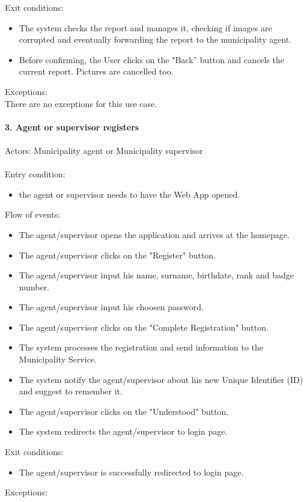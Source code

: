 \documentclass[a4paper]{report}
\begin{document}
Exit conditions:
\begin{itemize}
\item The system checks the report and manages it, checking if images are corrupted and eventually forwarding the report to the municipality agent.
\item	Before confirming, the User clicks on the "Back” button and cancels the current report. Pictures are cancelled too. 
\end{itemize}
Exceptions: \\
There are no exceptions for this use case. 
\\
\\
\textbf{3. Agent or supervisor registers}\label{uc:3}
\\
\\
Actors: Municipality agent or Municipality supervisor \\ \\
Entry condition:
\begin{itemize}
\item the agent or supervisor needs to have the Web App opened.
\end{itemize}
Flow of events:
\begin{itemize}
\item The agent/supervisor opens the application and arrives at the homepage.
\item The agent/supervisor clicks on the "Register" button.
\item The agent/supervisor input his name, surname, birthdate, rank and badge number.
\item The agent/supervisor input his choosen password.
\item The agent/supervisor clicks on the "Complete Registration" button.
\item The system processes the registration and send information to the Municipality Service.
\item The system notify the agent/supervisor about his new Unique Identifier (ID) and suggest to remember it. 
\item The agent/supervisor clicks on the "Understood" button.
\item The system redirects the agent/supervisor to login page.
\end{itemize}
Exit conditions:
\begin{itemize}
\item The agent/supervisor is successfully redirected to login page.
 \end{itemize}
Exceptions: 
\end{document}
